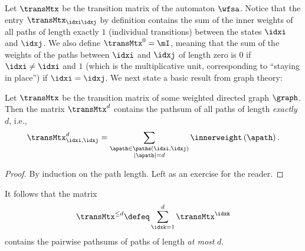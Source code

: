 Let $\transMtx$ be the transition matrix of the automaton $\wfsa$.
Notice that the entry $\transMtx_{\idxi\idxj}$ by definition contains the sum of the inner weights of all paths of length exactly $1$ (individual transitions) between the states $\idxi$ and $\idxj$.
We also define $\transMtx^0 = \mI$, meaning that the sum of the weights of the paths between $\idxi$ and $\idxj$ of length zero is $0$ if $\idxi \neq \idxi$ and $1$ (which is the multiplicative unit, corresponding to ``staying in place'') if $\idxi = \idxj$.
We next state a basic result from graph theory:
\begin{lemma}\label{lemma:matrix-prod-pathsum}
Let $\transMtx$ be the transition matrix of some weighted directed graph $\graph$. 
Then the matrix $\transMtx^d$ contains the pathsum of all paths of length \emph{exactly} $d$, i.e., 
\begin{equation}
    \transMtx^d_{\idxi, \idxj} = \sum_{\substack{\apath \in \paths\left(\idxi, \idxj\right)\\|\apath| = d}} \innerweight\left(\apath\right).
\end{equation}
\end{lemma}
\begin{proof}
By induction on the path length.
Left as an exercise for the reader.
\end{proof}
It follows that the matrix 
\begin{equation*}
    \transMtx^{\leq d} \defeq \sum_{\idxk = 1}^d \transMtx^{\idxk}
\end{equation*}
contains the pairwise pathsums of paths of length \emph{at most} $d$.

